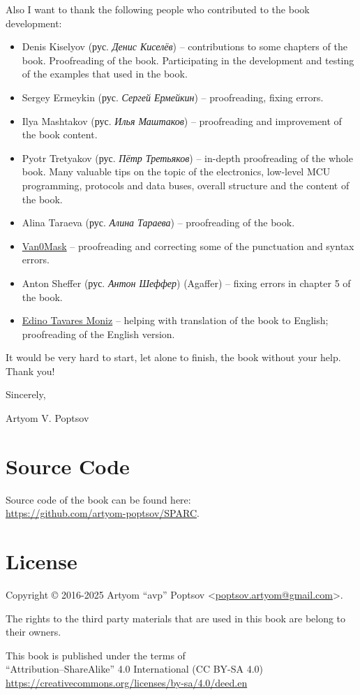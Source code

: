 \documentclass[../sparc.tex]{subfiles}
\begin{document}
Also I want to thank the following people who contributed to the book
development:
\begin{itemize}
\item Denis Kiselyov (рус. \emph{Денис Киселёв}) -- contributions to some
  chapters of the book.  Proofreading of the book.  Participating in the
  development and testing of the examples that used in the book.
\item Sergey Ermeykin (рус. \emph{Сергей Ермейкин}) -- proofreading, fixing
  errors.
\item Ilya Mashtakov (рус. \emph{Илья Маштаков}) – proofreading and improvement
  of the book content.
\item Pyotr Tretyakov (рус. \emph{Пётр Третьяков}) -- in-depth proofreading of
  the whole book.  Many valuable tips on the topic of the electronics, low-level
  MCU programming, protocols and data buses, overall structure and the content
  of the book.
\item Alina Taraeva (рус. \emph{Алина Тараева}) -- proofreading of the book.
\item \href{https://github.com/V4n0M4sk}{Van0Mask} -- proofreading and correcting some of the punctuation and syntax errors.
\item Anton Sheffer (рус. \emph{Антон Шеффер}) (Agaffer) -- fixing errors in
  chapter 5 of the book.
\item \href{https://github.com/onidemon37}{Edino Tavares Moniz} -- helping with
  translation of the book to English; proofreading of the English version.
\end{itemize}

It would be very hard to start, let alone to finish, the book without your help.
Thank you!
\vspace{5mm}

\hspace{1cm}Sincerely,

\hspace{1cm}Artyom V. Poptsov

\section*{Source Code}

Source code of the book can be found here: \\
\url{https://github.com/artyom-poptsov/SPARC}.

\section*{License}

Copyright © 2016-2025 Artyom ``avp'' Poptsov
<\href{mailto:poptsov.artyom@gmail.com}{poptsov.artyom@gmail.com}>.

The rights to the third party materials that are used in this book are belong to
their owners.

This book is published under the terms of \\ ``Attribution--ShareAlike'' 4.0
International (CC BY-SA 4.0)
\\ \url{https://creativecommons.org/licenses/by-sa/4.0/deed.en}
\end{document}
